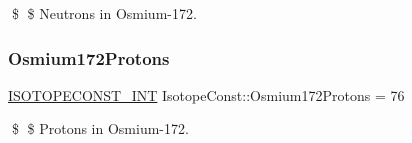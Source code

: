 \$ \$ Neutrons in Osmium-\/172. \mbox{\label{group___isotope_const-_osmium-_os172_ga3b424a7ad3a1ddae351e7b7c3385c0c3}} 
\subsubsection{\texorpdfstring{Osmium172\+Protons}{Osmium172Protons}}
{\footnotesize\ttfamily \mbox{\hyperlink{group___isotope_const-_macros_ga5f18360b3e99483a35c32d789e62621c}{I\+S\+O\+T\+O\+P\+E\+C\+O\+N\+S\+T\+\_\+\+I\+NT}} Isotope\+Const\+::\+Osmium172\+Protons = 76}

\$ \$ Protons in Osmium-\/172. 